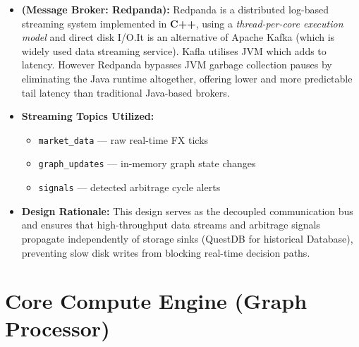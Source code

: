 \documentclass[letterpaper,11pt]{report}
\begin{document}
\begin{itemize}
    \item \textbf{(Message Broker: Redpanda):}  
    Redpanda is a distributed log-based streaming system implemented in \textbf{C++}, using a \emph{thread-per-core execution model} and direct disk I/O.It is an alternative of Apache Kafka (which is widely used data streaming service). Kafla utilises JVM which adds to latency. However Redpanda bypasses JVM garbage collection pauses by eliminating the Java runtime altogether, offering lower and more predictable tail latency than traditional Java-based brokers.
    \newpage

    \item \textbf{Streaming Topics Utilized:}
    \begin{itemize}
        \item \texttt{market\_data} — raw real-time FX ticks
        \item \texttt{graph\_updates} — in-memory graph state changes
        \item \texttt{signals} — detected arbitrage cycle alerts
    \end{itemize}

    \item \textbf{Design Rationale:} This design serves as the decoupled communication bus and ensures that high-throughput data streams and arbitrage signals propagate independently of storage sinks (QuestDB for historical Database), preventing slow disk writes from blocking real-time decision paths.
\end{itemize}



\section{Core Compute Engine (Graph Processor)}
\end{document}
